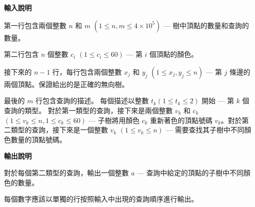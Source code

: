     \textbf{輸入說明}

    第一行包含兩個整數 $n$ 和 $m$ $(1 \le n, m \le 4\times 10^5)$ — 樹中頂點的數量和查詢的數量。

    第二行包含 $n$ 個整數 $c_i$ $(1 \le c_i \le 60)$ — 第 $i$ 個頂點的顏色。

    接下來的 $n-1$ 行，每行包含兩個整數 $x_j$ 和 $y_j$ $(1 \le x_j, y_j \le n)$ — 第 $j$ 條邊的兩個頂點。保證給出的是正確的無向樹。

    最後的 $m$ 行包含查詢的描述。
    每個描述以整數 $t_k (1 \le t_k \le 2)$ 開始 — 第 $k$ 個查詢的類型。
    對於第一類型的查詢，接下來是兩個整數 $v_k$ 和 $c_k$ $(1 \le v_k \le n, 1 \le c_k \le 60)$ — 
    子樹將用顏色 $c_k$ 重新著色的頂點號碼 $v_k$。對於第二類型的查詢，接下來是一個整數 $v_k$ $(1 \le v_k \le n)$ — 
    需要查找其子樹中不同顏色數量的頂點號碼。
    
    \textbf{輸出說明}

    對於每個第二類型的查詢，輸出一個整數 $a$ — 查詢中給定的頂點的子樹中不同顏色的數量。

    每個數字應該以單獨的行按照輸入中出現的查詢順序進行輸出。
